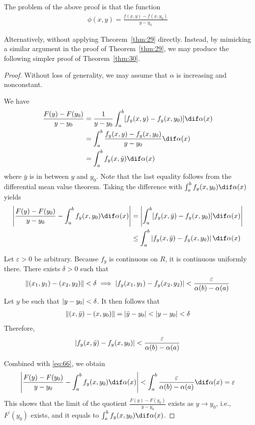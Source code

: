 \documentclass[thmcnt=section, color=blue, 12pt]{my-elegantbook}
\begin{document}
The problem of the above proof is that
the function
\begin{align*}
	\phi(x, y) = \frac{f(x, y) - f(x, y_0)}{y - y_0}
\end{align*}


Alternatively, without applying Theorem~\ref{thm:29} directly.
Instead, by mimicking a similar argument in the proof of  Theorem~\ref{thm:29},
we may produce the following simpler proof of Theorem~\ref{thm:30}.

\begin{proof}
	Without loss of generality, we may assume that $\alpha$ is increasing
	and nonconstant.

	We have
	\begin{align*}
		\frac{F(y) - F(y_0)}{y - y_0}
		 & = \frac{1}{y - y_0} \int_a^b [f_y(x, y) - f_y(x, y_0)] \dif \alpha(x) \\
		 & = \int_a^b \frac{f_y(x, y) - f_y(x, y_0)}{y - y_0} \dif \alpha(x)     \\
		 & = \int_a^b f_y(x, \bar{y}) \dif \alpha(x)
	\end{align*}
	where $\bar{y}$ is in between $y$ and $y_0$.
	Note that the last equality follows from the differential mean value theorem.
	Taking the difference with $\int_a^b f_y(x, y_0) \dif \alpha(x)$ yields
	\begin{align}
		\abs{\frac{F(y) - F(y_0)}{y - y_0} - \int_a^b f_y(x, y_0) \dif \alpha(x)}
		 & = \abs{\int_a^b [f_y(x, \bar{y}) - f_y(x, y_0)] \dif \alpha(x)}  \nonumber \\
		 & \leq \int_a^b \abs{f_y(x, \bar{y}) - f_y(x, y_0)} \dif \alpha(x)
		\label{eq:66}
	\end{align}

	Let $\varepsilon > 0$ be arbitrary.
	Because $f_y$ is continuous on $R$, it is continuous uniformly there.
	There exists $\delta > 0$ such that
	\begin{align*}
		\left\lVert (x_1, y_1) - (x_2, y_2) \right\rVert < \delta
		\implies \left\lvert f_y(x_1, y_1) - f_y(x_2, y_2) \right\rvert
		< \frac{\varepsilon}{\alpha(b) - \alpha(a)}
	\end{align*}
	Let $y$ be such that $\left\lvert y - y_0 \right\rvert < \delta$.
	It then follows that
	\begin{align*}
		\left\lVert (x, \bar{y}) - (x, y_0) \right\rVert = \left\lvert \bar{y} - y_0 \right\rvert
		< \left\lvert y - y_0 \right\rvert < \delta
	\end{align*}
	Therefore,
	\begin{align*}
		\left\lvert f_y(x, \bar{y}) - f_y(x, y_0) \right\rvert < \frac{\varepsilon}{\alpha(b) - \alpha(a)}
	\end{align*}

	Combined with \eqref{eq:66}, we obtain
	\begin{align*}
		\abs{\frac{F(y) - F(y_0)}{y - y_0} - \int_a^b f_y(x, y_0) \dif \alpha(x)}
		< \int_a^b \frac{\varepsilon}{\alpha(b) - \alpha(a)} \dif \alpha(x)
		= \varepsilon
	\end{align*}
	This shows that the limit of the quotient $\frac{F(y) - F(y_0)}{y - y_0}$
	exists as $y \to y_0$, i.e., $F^\prime(y_0)$ exists, and
	it equals to $\int_a^b f_y(x, y_0) \dif \alpha(x)$.
\end{proof}




\printbibliography[heading=bibintoc, title=References]


\printindex
\end{document}
